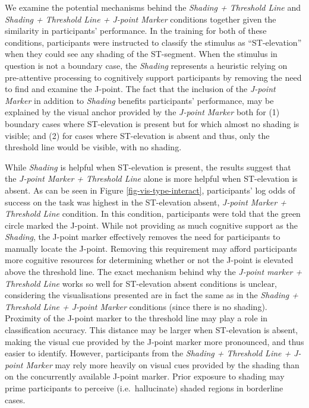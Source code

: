 \documentclass[
  10pt,
  letterpaper,
]{article}
\begin{document}
We examine the potential mechanisms behind the
\emph{Shading + Threshold Line} and
\emph{Shading + Threshold Line + J-point Marker} conditions together
given the similarity in participants' performance. In the training for
both of these conditions, participants were instructed to classify the
stimulus as ``ST-elevation'' when they could see any shading of the
ST-segment. When the stimulus in question is not a boundary case, the
\emph{Shading} represents a heuristic relying on pre-attentive
processing \citep{northdruft_1993} to cognitively support
\citep{tory_2004} participants by removing the need to find and examine
the J-point. The fact that the inclusion of the \emph{J-point Marker} in
addition to \emph{Shading} benefits participants' performance, may be
explained by the visual anchor provided by the \emph{J-point Marker}
both for (1) boundary cases where ST-elevation is present but for which
almost no shading is visible; and (2) for cases where ST-elevation is
absent and thus, only the threshold line would be visible, with no
shading.

While \emph{Shading} is helpful when ST-elevation is present, the
results suggest that the \emph{J-point Marker + Threshold Line} alone is
more helpful when ST-elevation is absent. As can be seen in Figure
\ref{fig-vis-type-interact}, participants' log odds of success on the
task was highest in the ST-elevation absent,
\emph{J-point Marker + Threshold Line} condition. In this condition,
participants were told that the green circle marked the J-point. While
not providing as much cognitive support as the \emph{Shading}, the
J-point marker effectively removes the need for participants to manually
locate the J-point. Removing this requirement may afford participants
more cognitive resources for determining whether or not the J-point is
elevated above the threshold line. The exact mechanism behind why the
\emph{J-point marker + Threshold Line} works so well for ST-elevation
absent conditions is unclear, considering the visualisations presented
are in fact the same as in the
\emph{Shading + Threshold Line + J-point Marker} conditions (since there
is no shading). Proximity of the J-point marker to the threshold line
may play a role in classification accuracy. This distance may be larger
when ST-elevation is absent, making the visual cue provided by the
J-point marker more pronounced, and thus easier to identify. However,
participants from the \emph{Shading + Threshold Line + J-point Marker}
may rely more heavily on visual cues provided by the shading than on the
concurrently available J-point marker. Prior exposure to shading may
prime participants to perceive (i.e.~hallucinate) shaded regions in
borderline cases.
\end{document}
